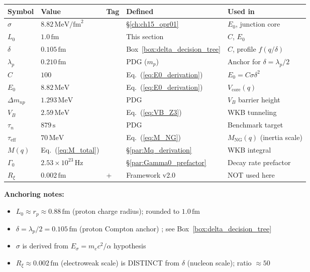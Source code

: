 \begin{tcolorbox}[colback=gray!5!white, colframe=gray!60!black,
                  title={\textbf{Parameter Provenance Table (Route C)}}]
\label{box:param_provenance}

\small
\begin{center}
\begin{tabular}{llllp{4.5cm}}
\toprule
\textbf{Symbol} & \textbf{Value} & \textbf{Tag} & \textbf{Defined} & \textbf{Used in} \\
\midrule
$\sigma$ & $8.82\,\mathrm{MeV/fm}^2$ & \tagDc{} & \S\ref{ch:ch15_opr01} & $E_0$, junction core \\
$L_0$ & $1.0\,\mathrm{fm}$ & \tagI{} & This section & $C$, $E_0$ \\
$\delta$ & $0.105\,\mathrm{fm}$ & \tagI{} & Box~\ref{box:delta_decision_tree} & $C$, profile $f(q/\delta)$ \\
$\lambda_p$ & $0.210\,\mathrm{fm}$ & \tagBL{} & PDG ($m_p$) & Anchor for $\delta = \lambda_p/2$ \\
$C$ & $100$ & \tagDc{} & Eq.~(\ref{eq:E0_derivation}) & $E_0 = C\sigma\delta^2$ \\
$E_0$ & $8.82\,\mathrm{MeV}$ & \tagDc{} & Eq.~(\ref{eq:E0_derivation}) & $V_{\mathrm{core}}(q)$ \\
$\Delta m_{np}$ & $1.293\,\mathrm{MeV}$ & \tagBL{} & PDG & $V_B$ barrier height \\
$V_B$ & $2.59\,\mathrm{MeV}$ & \tagDc{} & Eq.~(\ref{eq:VB_Z3}) & WKB tunneling \\
$\tau_n$ & $879\,\mathrm{s}$ & \tagBL{} & PDG & Benchmark target \\
$\tau_{\mathrm{eff}}$ & $70\,\mathrm{MeV}$ & \tagDc{} & Eq.~(\ref{eq:M_NG}) & $M_{\mathrm{NG}}(q)$ (inertia scale) \\
$M(q)$ & Eq.~(\ref{eq:M_total}) & \tagDc{} & \S\ref{par:Mq_derivation} & WKB integral \\
$\Gamma_0$ & $2.53\times 10^{23}\,\mathrm{Hz}$ & \tagDc{} & \S\ref{par:Gamma0_prefactor} & Decay rate prefactor \\
$R_\xi$ & $0.002\,\mathrm{fm}$ & \tagP{}+\tagBL{} & Framework v2.0 & NOT used here \\
\bottomrule
\end{tabular}
\end{center}

\textbf{Anchoring notes:}
\begin{itemize}[nosep]
  \item $L_0 \approx r_p \approx 0.88\,\mathrm{fm}$ (proton charge radius); rounded to $1.0\,\mathrm{fm}$ \tagI{}
  \item $\delta = \lambda_p/2 = 0.105\,\mathrm{fm}$ (proton Compton anchor) \tagI{}; see Box~\ref{box:delta_decision_tree}
  \item $\sigma$ is derived from $E_\sigma = m_e c^2/\alpha$ hypothesis \tagDc{}
  \item $R_\xi \approx 0.002\,\mathrm{fm}$ (electroweak scale) is DISTINCT from $\delta$ (nucleon scale); ratio $\approx 50$
\end{itemize}


\end{tcolorbox}
